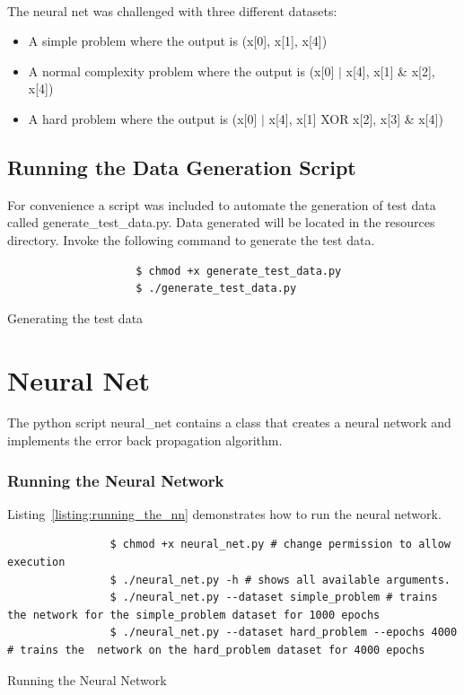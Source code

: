 \documentclass[11pt, a4paper]{article}
\begin{document}
        \paragraph{} The neural net was challenged with three different datasets:
        \begin{itemize}
            \item A simple problem where the output is (x[0], x[1], x[4])
            \item A normal complexity problem where the output is (x[0] \( \vert \) x[4], x[1] \& x[2], x[4])
            \item A hard problem where the output is (x[0] \( \vert \) x[4], x[1] XOR x[2], x[3] \& x[4])
        \end{itemize}
        \subsection{Running the Data Generation Script}
            For convenience a script was included to automate the generation of test data called generate\_test\_data.py. Data generated will be located in the resources directory. Invoke the following command to generate the test data.
            \begin{listing}[H]
                \begin{verbatim}
                    $ chmod +x generate_test_data.py
                    $ ./generate_test_data.py
                \end{verbatim}
                \caption{Generating the test data}
            \end{listing}
    \section{Neural Net}
        The python script neural\_net contains a class that creates a neural network and implements the error back propagation algorithm.
        \subsubsection{Running the Neural Network}
        Listing~\ref{listing:running_the_nn} demonstrates how to run the neural network.
        \begin{listing}[H]
            \begin{verbatim}
                $ chmod +x neural_net.py # change permission to allow execution
                $ ./neural_net.py -h # shows all available arguments.
                $ ./neural_net.py --dataset simple_problem # trains the network for the simple_problem dataset for 1000 epochs
                $ ./neural_net.py --dataset hard_problem --epochs 4000 # trains the  network on the hard_problem dataset for 4000 epochs
            \end{verbatim}
            \caption{Running the Neural Network}
            \label{listing:running_the_nn}
        \end{listing}
\end{document}
